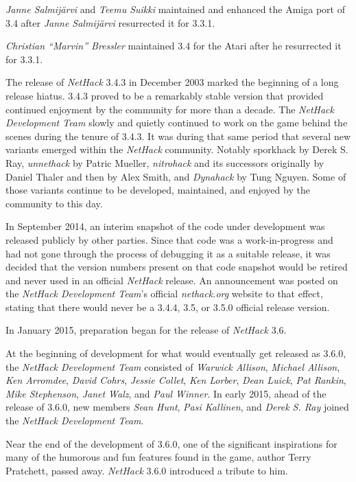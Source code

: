 \documentclass[titlepage]{article}
\begin{document}
\medskip
\noindent \textit{Janne Salmij\"{a}rvi} and \textit{Teemu Suikki} maintained
and enhanced the Amiga port of 3.4 after \textit{Janne Salmij\"{a}rvi} resurrected
it for 3.3.1.

\medskip
\noindent \textit{Christian ``Marvin'' Bressler} maintained 3.4 for the Atari after he
resurrected it for 3.3.1.

\medskip
The release of \textit{NetHack} 3.4.3 in December 2003 marked the beginning of
a long release hiatus. 3.4.3 proved to be a remarkably stable version that
provided continued enjoyment by the community for more than a decade. The
\textit{NetHack Development Team} slowly and quietly continued to work on the game behind the scenes
during the tenure of 3.4.3. It was during that same period that several new
variants emerged within the \textit{NetHack} community. Notably sporkhack by
Derek S. Ray, \textit{unnethack} by Patric Mueller, \textit{nitrohack} and its
successors originally by Daniel Thaler and then by Alex Smith, and
\textit{Dynahack} by Tung Nguyen.
Some of those variants continue to be
developed, maintained, and enjoyed by the community to this day.

\medskip
In September 2014, an interim snapshot of the code under development was
released publicly by other parties.
Since that code was a work-in-progress
and had not gone through the process of debugging it as a suitable release,
it was decided that the version numbers present on that code snapshot would
be retired and never used in an official \textit{NetHack} release.
An announcement was posted on the \textit{NetHack Development Team}'s official
\textit{nethack.org} website
to that effect, stating that there would never be a 3.4.4, 3.5, or 3.5.0
official release version.

\medskip
In January 2015, preparation began for the release of \textit{NetHack} 3.6.

\medskip
At the beginning of development for what would eventually get released as
3.6.0, the \textit{NetHack Development Team} consisted of \textit{Warwick Allison},
\textit{Michael Allison}, \textit{Ken Arromdee},
\textit{David Cohrs}, \textit{Jessie Collet},
\textit{Ken Lorber}, \textit{Dean Luick}, \textit{Pat Rankin},
\textit{Mike Stephenson}, \textit{Janet Walz}, and \textit{Paul Winner}.
In early 2015, ahead of the release of 3.6.0, new members
\textit{Sean Hunt}, \textit{Pasi Kallinen}, and \textit{Derek S. Ray}
joined the \textit{NetHack Development Team}.

\medskip
Near the end of the development of 3.6.0, one of the significant inspirations
for many of the humorous and fun features found in the game,
author Terry Pratchett, passed away. \textit{NetHack} 3.6.0 introduced
a tribute to him.
\end{document}
